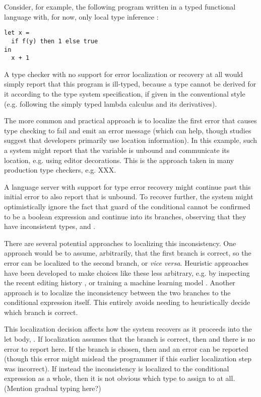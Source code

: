 Consider, for example, the following program written in a typed functional language with, for now, only local type inference \cite{pierce}: 
\begin{lstlisting}[numbers=none]
let x = 
  if f(y) then 1 else true
in 
  x + 1
\end{lstlisting}
A type checker with no support for error localization or recovery at all would simply report that this program is ill-typed, because a type cannot be derived for it according to the type system specification, if given in the conventional style (e.g. following the simply typed lambda calculus and its derivatives). 

The more common and practical approach is to localize the first error that causes type checking to fail and emit an error message (which can help, though studies suggest that developers primarily use location information). In this example, such a system might report that the variable  is unbound and communicate its location, e.g. using editor decorations. 
This is the approach taken in many production type checkers, e.g. XXX.

A language server with support for type error recovery might continue past this initial error to also report that  is unbound. To recover further, the system might optimistically ignore the fact that guard of the conditional cannot be confirmed to be a boolean expression and continue into its branches, observing that they have inconsistent types,  and . 

There are several potential approaches to localizing this inconsistency. 
One approach would be to assume, arbitrarily, that the first branch is correct, so the error can be localized to the second branch, or \emph{vice versa}. 
Heuristic approaches have been developed to make choices like these less arbitrary, e.g. by inspecting the recent editing history , or training a machine learning model . 
Another approach is to localize the inconsistency between the two branches to the conditional expression itself. This entirely avoids needing to heuristically decide which branch is correct. 

This localization decision affects how the system recovers as it proceeds into the let body, . 
If localization assumes that the  branch is correct, then  and there is no error to report here.
If the  branch is chosen, then  and an error can be reported (though this error might mislead the programmer if this earlier localization step was incorrect). 
If instead the inconsistency is localized to the conditional expression as a whole, then it is not obvious which type to assign to  at all. (Mention gradual typing here?)

